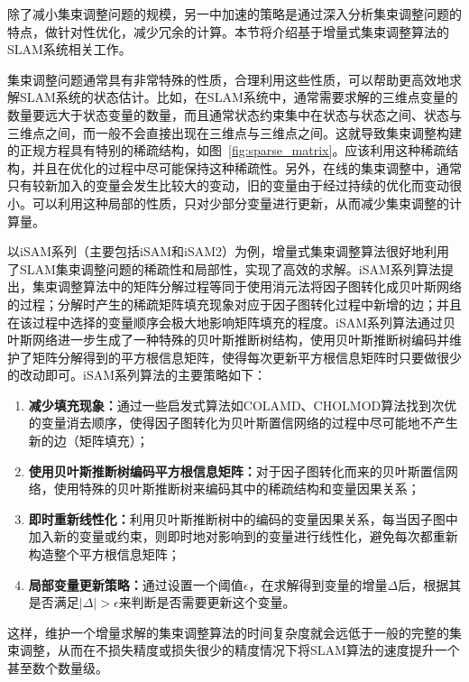 除了减小集束调整问题的规模，另一中加速的策略是通过深入分析集束调整问题的特点，做针对性优化，减少冗余的计算。本节将介绍基于增量式集束调整算法的SLAM系统相关工作。

集束调整问题通常具有非常特殊的性质，合理利用这些性质，可以帮助更高效地求解SLAM系统的状态估计。比如，在SLAM系统中，通常需要求解的三维点变量的数量要远大于状态变量的数量，而且通常状态约束集中在状态与状态之间、状态与三维点之间，而一般不会直接出现在三维点与三维点之间。这就导致集束调整构建的正规方程具有特别的稀疏结构，如图~\ref{fig:sparse_matrix}。应该利用这种稀疏结构，并且在优化的过程中尽可能保持这种稀疏性。另外，在线的集束调整中，通常只有较新加入的变量会发生比较大的变动，旧的变量由于经过持续的优化而变动很小。可以利用这种局部的性质，只对少部分变量进行更新，从而减少集束调整的计算量。

以iSAM系列（主要包括iSAM\citep{kaess2008isam}和iSAM2\citep{kaess2012isam2}）为例，增量式集束调整算法很好地利用了SLAM集束调整问题的稀疏性和局部性，实现了高效的求解。iSAM系列算法提出，集束调整算法中的矩阵分解过程等同于使用消元法将因子图转化成贝叶斯网络的过程；分解时产生的稀疏矩阵填充现象对应于因子图转化过程中新增的边；并且在该过程中选择的变量顺序会极大地影响矩阵填充的程度。iSAM系列算法通过贝叶斯网络进一步生成了一种特殊的贝叶斯推断树结构，使用贝叶斯推断树编码并维护了矩阵分解得到的平方根信息矩阵，使得每次更新平方根信息矩阵时只要做很少的改动即可。iSAM系列算法的主要策略如下：
\begin{enumerate}
    \item \textbf{减少填充现象：}通过一些启发式算法如COLAMD\citep{davis2004algorithm}、CHOLMOD\citep{chen2008algorithm}算法找到次优的变量消去顺序，使得因子图转化为贝叶斯置信网络的过程中尽可能地不产生新的边（矩阵填充）；
    \item \textbf{使用贝叶斯推断树编码平方根信息矩阵：}对于因子图转化而来的贝叶斯置信网络，使用特殊的贝叶斯推断树来编码其中的稀疏结构和变量因果关系；
    \item \textbf{即时重新线性化：}利用贝叶斯推断树中的编码的变量因果关系，每当因子图中加入新的变量或约束，则即时地对影响到的变量进行线性化，避免每次都重新构造整个平方根信息矩阵；
    \item \textbf{局部变量更新策略：}通过设置一个阈值$\epsilon$，在求解得到变量的增量$\Delta$后，根据其是否满足$|\Delta|>\epsilon$来判断是否需要更新这个变量。
\end{enumerate}
这样，维护一个增量求解的集束调整算法的时间复杂度就会远低于一般的完整的集束调整，从而在不损失精度或损失很少的精度情况下将SLAM算法的速度提升一个甚至数个数量级。

